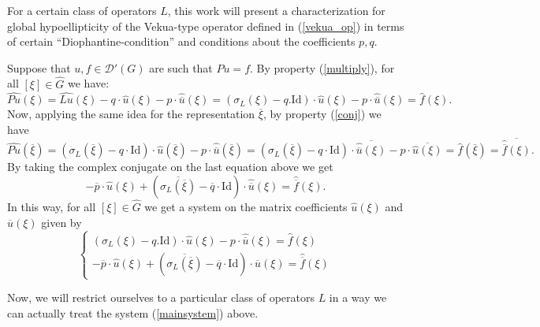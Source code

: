 \documentclass[sn-mathphys-num]{sn-jnl}%
\numberwithin{equation}{section}
\theoremstyle{thmstyleone}
\theoremstyle{thmstyletwo}
\theoremstyle{thmstylethree}
\begin{document}
For a certain class of operators $L$, this work will present a characterization for global hypoellipticity of the Vekua-type operator defined in (\ref{vekua_op}) in terms of certain ``Diophantine-condition'' and conditions about the coefficients $p,q$. 

Suppose that $u,f \in \mathcal{D}'(G)$ are such that $Pu=f$. By property (\ref{multiply}), for all $[\xi] \in \widehat{G}$ we have:
$$\widehat{Pu}(\xi) = \widehat{Lu}(\xi)-q \cdot \widehat{u}(\xi)-p \cdot \widehat{\overline{u}}(\xi)=(\sigma_L(\xi)-q. \textrm{Id})\cdot \widehat{u}(\xi)-p \cdot \widehat{\overline{u}}(\xi)=\widehat{f}(\xi).$$
Now, applying the same idea for the representation $\overline{\xi}$, by property (\ref{conj}) we have
$$\widehat{Pu}(\overline{\xi})=(\sigma_L(\overline{\xi})-q \cdot \textrm{Id}) \cdot \widehat{u}(\overline{\xi}) - p \cdot \widehat{ \overline{u}}(\overline{\xi}) =(\sigma_L(\overline{\xi})-q \cdot \textrm{Id}) \cdot \overline{ \widehat{ \overline{u}}(\xi)}-p \cdot \overline{ \widehat{u}(\xi)} = \widehat{f}(\overline{\xi})=\overline{ \widehat{\overline{f}}(\xi)}. $$
By taking the complex conjugate on the last equation above we get
$$-\overline{p} \cdot \widehat{u}(\xi) + (\overline{\sigma_L(\overline{\xi})}-\overline{q} \cdot \textrm{Id}) \cdot \widehat{ \overline{u}}(\xi) = \widehat{\overline{f}}(\xi).$$  
In this way, for all $[\xi] \in \widehat{G}$ we get a system on the matrix coefficients $\widehat{u}(\xi)$ and $\widehat{\overline{u}}(\xi)$ given by
\begin{equation}\label{mainsystem}
	\left \{ \begin{array}{c} (\sigma_L(\xi)-q. \textrm{Id})\cdot \widehat{u}(\xi)-p \cdot \widehat{\overline{u}}(\xi)=\widehat{f}(\xi) \\ -\overline{p} \cdot \widehat{u}(\xi) + (\overline{\sigma_L(\overline{\xi})}-\overline{q} \cdot \textrm{Id}) \cdot \widehat{ \overline{u}}(\xi) = \widehat{\overline{f}}(\xi)   \end{array}   \right.
\end{equation}

Now, we will restrict ourselves to a particular class of operators $L$ in a way we can actually treat the system (\ref{mainsystem}) above.
\end{document}

